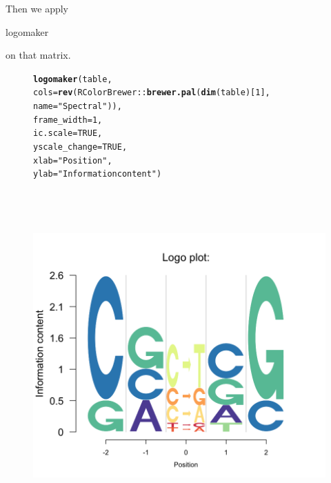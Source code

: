 \documentclass[12pt]{article}\usepackage[]{graphicx}\usepackage[usenames,dvipsnames]{color}
\makeatletter
\newcommand{\hlnum}[1]{\textcolor[rgb]{0.686,0.059,0.569}{#1}}%
\newcommand{\hlstr}[1]{\textcolor[rgb]{0.192,0.494,0.8}{#1}}%
\newcommand{\hlopt}[1]{\textcolor[rgb]{0,0,0}{#1}}%
\newcommand{\hlstd}[1]{\textcolor[rgb]{0.345,0.345,0.345}{#1}}%
\newcommand{\hlkwc}[1]{\textcolor[rgb]{0.333,0.667,0.333}{#1}}%
\newcommand{\hlkwd}[1]{\textcolor[rgb]{0.737,0.353,0.396}{\textbf{#1}}}%
\newenvironment{kframe}{%
 \def\at@end@of@kframe{}%
 \ifinner\ifhmode%
  \def\at@end@of@kframe{\end{minipage}}%
  \begin{minipage}{\columnwidth}%
 \fi\fi%
 \def\FrameCommand##1{\hskip\@totalleftmargin \hskip-\fboxsep
 \colorbox{shadecolor}{##1}\hskip-\fboxsep
     \hskip-\linewidth \hskip-\@totalleftmargin \hskip\columnwidth}%
 \MakeFramed {\advance\hsize-\width
   \@totalleftmargin\z@ \linewidth\hsize
   \@setminipage}}%
 {\par\unskip\endMakeFramed%
 \at@end@of@kframe}
\newenvironment{knitrout}{}{} %
\makeatother
\begin{document}
Then we apply \begin{verb} logomaker \end{verb} on that matrix.

\begin{figure}[htp]
\begin{center}
\begin{knitrout}
\color{fgcolor}\begin{kframe}
\begin{alltt}
\hlkwd{logomaker}\hlstd{(table,}
          \hlkwc{cols}\hlstd{=} \hlkwd{rev}\hlstd{(RColorBrewer}\hlopt{::}\hlkwd{brewer.pal}\hlstd{(}\hlkwd{dim}\hlstd{(table)[}\hlnum{1}\hlstd{],}
          \hlkwc{name} \hlstd{=} \hlstr{"Spectral"}\hlstd{)),}
          \hlkwc{frame_width} \hlstd{=} \hlnum{1}\hlstd{,}
          \hlkwc{ic.scale} \hlstd{=} \hlnum{TRUE}\hlstd{,}
          \hlkwc{yscale_change}\hlstd{=}\hlnum{TRUE}\hlstd{,}
          \hlkwc{xlab} \hlstd{=} \hlstr{"Position"}\hlstd{,}
          \hlkwc{ylab} \hlstd{=} \hlstr{"Information content"}\hlstd{)}
\end{alltt}
\end{kframe}
\includegraphics[width=6in,height=5in]{figure/logolas_use_7-1} 

\end{knitrout}
\end{center}
\end{figure}
\end{document}
